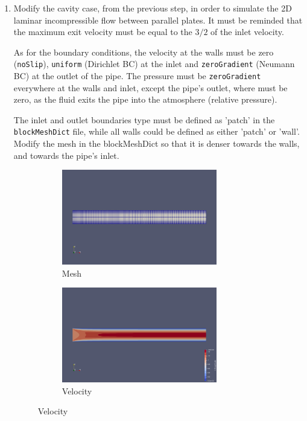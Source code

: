 \documentclass{article}
\begin{document}
\begin{enumerate}[label=1.\arabic*]
 	\item Modify the cavity case, from the previous step, in order to simulate the 2D laminar incompressible flow between parallel plates. It must be reminded that the maximum exit velocity must be equal to the $3/2$ of the inlet velocity.
 	
 	As for the boundary conditions, the velocity at the walls must be zero ({\tt noSlip}), {\tt uniform} (Dirichlet BC) at the inlet and {\tt zeroGradient} (Neumann BC) at the outlet of the pipe. The pressure must be {\tt zeroGradient} everywhere at the walls and inlet, except the pipe's outlet, where must be zero, as the fluid exits the pipe into the atmosphere (relative pressure). 
 	
 	The inlet and outlet boundaries type must be defined as 'patch' in the {\tt blockMeshDict} file, while all walls could be defined as either 'patch' or 'wall'. Modify the mesh in the blockMeshDict so that it is denser towards the walls, and towards the pipe’s inlet.
 	

	\begin{figure}[h]
		\begin{subfigure}{\textwidth}
			\centering
			\includegraphics[width=0.8\textwidth,trim={0cm 12cm 0 12cm},clip]{2D_mesh.png}
			\caption{Mesh}
		\end{subfigure}
 		\begin{subfigure}{\textwidth}
 			\centering
 			\includegraphics[width=0.8\textwidth,trim={0cm 12cm 0 12cm},clip]{2D_velocity.png}
 			\caption{Velocity}
 		\end{subfigure}	
 	\end{figure}
 	

\end{enumerate}
\end{document}
